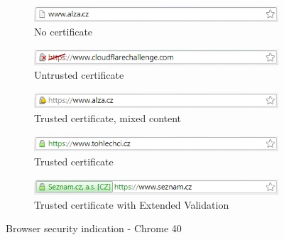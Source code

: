 \begin{figure}
  \begin{subfigure}[b]{\textwidth}
    \centering
    \includegraphics[scale=0.6]{images/browsers/ch-none.png}
    \caption{No certificate}
  \end{subfigure}
  \begin{subfigure}[b]{\textwidth}
    \centering
    \includegraphics[scale=0.6]{images/browsers/ch-untrusted.png}
    \caption{Untrusted certificate}
  \end{subfigure}
  \begin{subfigure}[b]{\textwidth}
    \centering
    \includegraphics[scale=0.6]{images/browsers/ch-mixed.png}
    \caption{Trusted certificate, mixed content}
  \end{subfigure}
  \begin{subfigure}[b]{\textwidth}
    \centering
    \includegraphics[scale=0.6]{images/browsers/ch-dv.png}
    \caption{Trusted certificate}
  \end{subfigure}
  \begin{subfigure}[b]{\textwidth}
    \centering
    \includegraphics[scale=0.6]{images/browsers/ch-ev.png}
    \caption{Trusted certificate with Extended Validation}
  \end{subfigure}
  \caption{Browser security indication - Chrome 40}
\end{figure}

